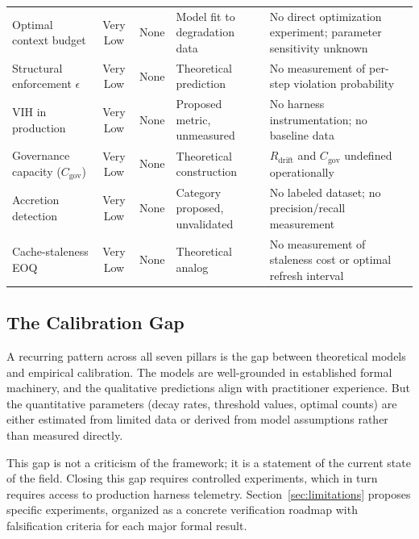 \documentclass[11pt, a4paper, logo, copyright]{googledeepmind}
\begin{document}
\begin{table}[H]
\begin{tabular}{p{2.4cm}cp{1.5cm}p{2cm}p{4cm}}
\addlinespace
Optimal context budget & Very Low & None & Model fit to degradation data & No direct optimization experiment; parameter sensitivity unknown \\
\addlinespace
Structural enforcement $\epsilon$ & Very Low & None & Theoretical prediction & No measurement of per-step violation probability \\
\addlinespace
VIH in production & Very Low & None & Proposed metric, unmeasured & No harness instrumentation; no baseline data \\
\addlinespace
Governance capacity ($C_{\text{gov}}$) & Very Low & None & Theoretical construction & $R_{\text{drift}}$ and $C_{\text{gov}}$ undefined operationally \\
\addlinespace
Accretion detection & Very Low & None & Category proposed, unvalidated & No labeled dataset; no precision/recall measurement \\
\addlinespace
Cache-staleness EOQ & Very Low & None & Theoretical analog & No measurement of staleness cost or optimal refresh interval \\
\bottomrule
\end{tabular}
\end{table}

\subsection{The Calibration Gap}

A recurring pattern across all seven pillars is the gap between theoretical models and empirical calibration. The models are well-grounded in established formal machinery, and the qualitative predictions align with practitioner experience. But the quantitative parameters (decay rates, threshold values, optimal counts) are either estimated from limited data or derived from model assumptions rather than measured directly.

This gap is not a criticism of the framework; it is a statement of the current state of the field. Closing this gap requires controlled experiments, which in turn requires access to production harness telemetry. Section~\ref{sec:limitations} proposes specific experiments, organized as a concrete verification roadmap with falsification criteria for each major formal result.


\end{document}
